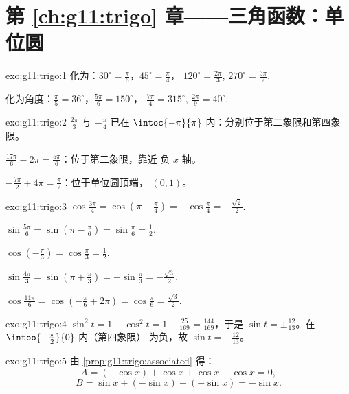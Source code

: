 \section*{第 \ref{ch:g11:trigo} 章——三角函数：单位圆}

\begin{solution}{exo:g11:trigo:1}
化为：$30^\circ = \frac{\pi}{6}$，$45^\circ = \frac{\pi}{4}$，
$120^\circ = \frac{2\pi}{3}$, $270^\circ = \frac{3\pi}{2}$.

化为角度：$\frac{\pi}{5} = 36^\circ$，$\frac{5\pi}{6} = 150^\circ$，
$\frac{7\pi}{4} = 315^\circ$, $\frac{2\pi}{9} = 40^\circ$.
\end{solution}

\begin{solution}{exo:g11:trigo:2}
$\frac{2\pi}{3}$ 与 $-\frac{\pi}{4}$ 已在
$\intoc{-\pi}{\pi}$ 内：分别位于第二象限和第四象限。

$\frac{17\pi}{6} - 2\pi = \frac{5\pi}{6}$：位于第二象限，靠近
负 $x$ 轴。

$-\frac{7\pi}{2} + 4\pi = \frac{\pi}{2}$：位于单位圆顶端，
$(0, 1)$。
\end{solution}

\begin{solution}{exo:g11:trigo:3}
$\cos\frac{3\pi}{4} = \cos\left(\pi - \frac\pi4\right)
= -\cos\frac\pi4 = -\frac{\sqrt2}{2}$.

$\sin\frac{5\pi}{6} = \sin\left(\pi - \frac\pi6\right)
= \sin\frac\pi6 = \frac12$.

$\cos\left(-\frac\pi3\right) = \cos\frac\pi3 = \frac12$.

$\sin\frac{4\pi}{3} = \sin\left(\pi + \frac\pi3\right)
= -\sin\frac\pi3 = -\frac{\sqrt3}{2}$.

$\cos\frac{11\pi}{6} = \cos\left(-\frac\pi6 + 2\pi\right)
= \cos\frac\pi6 = \frac{\sqrt3}{2}$.
\end{solution}

\begin{solution}{exo:g11:trigo:4}
$\sin^2 t = 1 - \cos^2 t = 1 - \frac{25}{169} = \frac{144}{169}$，于是
$\sin t = \pm\frac{12}{13}$。在 $\intoo{-\frac\pi2}{0}$ 内（第四象限）
为负，故 $\sin t = -\frac{12}{13}$。
\end{solution}

\begin{solution}{exo:g11:trigo:5}
由 \cref{prop:g11:trigo:associated} 得：
\[
A = (-\cos x) + \cos x + \cos x - \cos x = 0 ,
\]
\[
B = \sin x + (-\sin x) + (-\sin x) = -\sin x .
\]
\end{solution}

